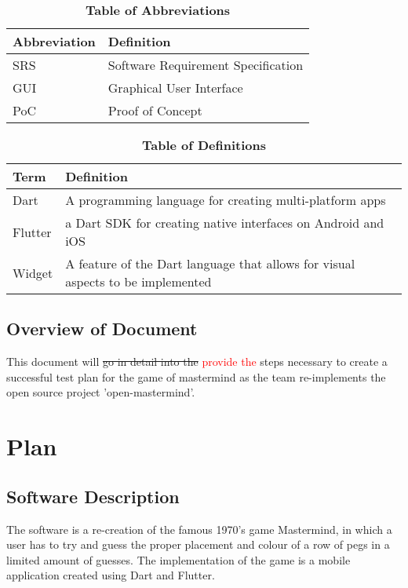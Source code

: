 \documentclass[12pt, titlepage]{article}
\begin{document}
\begin{table}[H]
\caption{\textbf{Table of Abbreviations}} \label{Table}

\begin{tabularx}{\textwidth}{p{3cm}X}
\toprule
\textbf{Abbreviation} & \textbf{Definition} \\
\midrule
SRS & Software Requirement Specification\\
GUI & Graphical User Interface\\
PoC & Proof of Concept\\
\bottomrule
\end{tabularx}

\end{table}

\begin{table}[H]
\caption{\textbf{Table of Definitions}} \label{Table}

\begin{tabularx}{\textwidth}{p{3cm}X}
\toprule
\textbf{Term} & \textbf{Definition}\\
\midrule
Dart & A programming language for creating multi-platform apps\\
Flutter & a Dart SDK for creating native interfaces on Android and iOS\\
Widget & A feature of the Dart language that allows for visual aspects to be implemented\\
\bottomrule
\end{tabularx}

\end{table}	

\subsection{Overview of Document}

This document will \sout{go in detail into the} \textcolor{red}{provide the} steps necessary to create a successful test plan for the game of mastermind as the team re-implements the open source project 'open-mastermind'. 

\section{Plan}
	
\subsection{Software Description}
The software is a re-creation of the famous 1970's game Mastermind, in which a user has to try and guess the proper placement and colour of a row of pegs in a limited amount of guesses. The implementation of the game is a mobile application created using Dart and Flutter.
\end{document}
